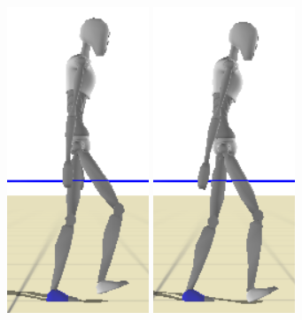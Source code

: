 \documentclass[conference]{acmsiggraph}
\begin{document}
\begin{figure}[t]
\includegraphics[scale=0.17]{images/strips/0_75/7.png}
\includegraphics[scale=0.17]{images/strips/0_75/8.png}


\end{figure}
\end{document}
